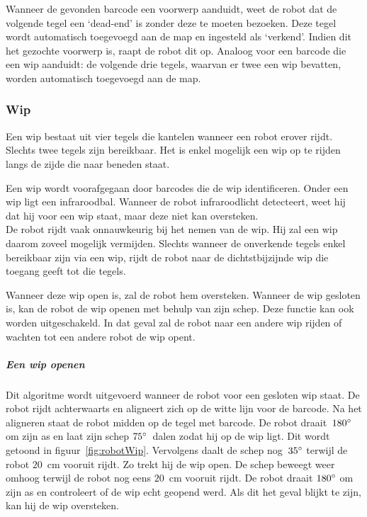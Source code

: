 \documentclass[eind]{penoverslag}
\begin{document}

Wanneer de gevonden barcode een voorwerp aanduidt, weet de robot dat de volgende tegel een `dead-end' is zonder deze te moeten bezoeken. Deze tegel wordt automatisch toegevoegd aan de map en ingesteld als `verkend'. Indien dit het gezochte voorwerp is, raapt de robot dit op.
Analoog voor een barcode die een wip aanduidt: de volgende drie tegels, waarvan er twee een wip bevatten, worden automatisch toegevoegd aan de map.


\subsubsection{Wip}
\label{sssec:AlgoWip}
Een wip bestaat uit vier tegels die kantelen wanneer een robot erover rijdt. Slechts twee tegels zijn bereikbaar. Het is enkel mogelijk een wip op te rijden langs de zijde die naar beneden staat.

Een wip wordt voorafgegaan door barcodes die de wip identificeren. Onder een wip ligt een infraroodbal. Wanneer de robot infraroodlicht detecteert, weet hij dat hij voor een wip staat, maar deze niet kan oversteken. \\

De robot rijdt vaak onnauwkeurig bij het nemen van de wip. Hij zal een wip daarom zoveel mogelijk vermijden. Slechts wanneer de onverkende tegels enkel bereikbaar zijn via een wip, rijdt de robot naar de dichtstbijzijnde wip die toegang geeft tot die tegels.

Wanneer deze wip open is, zal de robot hem oversteken. Wanneer de wip gesloten is, kan de robot de wip openen met behulp van zijn schep. Deze functie kan ook worden uitgeschakeld. In dat geval zal de robot naar een andere wip rijden of wachten tot een andere robot de wip opent.

\subparagraph{Een wip openen} 
Dit algoritme wordt uitgevoerd wanneer de robot voor een gesloten wip staat. De robot rijdt achterwaarts en aligneert zich op de witte lijn voor de barcode. Na het aligneren staat de robot midden op de tegel met barcode. De robot draait~$180\degree$ om zijn as en laat zijn schep $75\degree$~dalen zodat hij op de wip ligt. Dit wordt getoond in figuur~\ref{fig:robotWip}. Vervolgens daalt de schep nog~$35\degree$ terwijl de robot $20$~cm vooruit rijdt. Zo trekt hij de wip open. De schep beweegt weer omhoog terwijl de robot nog eens $20$~cm vooruit rijdt. De robot draait $180\degree$ om zijn as en controleert of de wip echt geopend werd. Als dit het geval blijkt te zijn, kan hij de wip oversteken.
\end{document}
